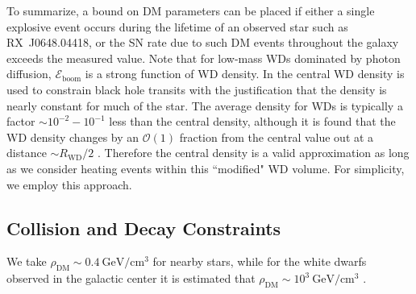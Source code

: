 \documentclass[twocolumn,preprintnumbers,amsmath,amssymb,prd, superscriptaddress]{revtex4} %
\newcommand{\Eboom}{\mathcal{E}_\text{boom}}
\newcommand{\OO}{\mathcal{O}}
\newcommand{\GeV}{\text{GeV}}
\def\r{\right)}
\def\l{\left(}
\begin{document}
To summarize, a bound on DM parameters can be placed if either a single explosive event occurs during the lifetime of an observed star such as RX~J0648.04418, or the SN rate due to such DM events throughout the galaxy exceeds the measured value.
Note that for low-mass WDs dominated by photon diffusion, $\Eboom$ is a strong function of WD density.
In \cite{Graham:2015apa} the central WD density is used to constrain black hole transits with the justification that the density is nearly constant for much of the star.
The average density for WDs is typically a factor $\sim 10^{-2} - 10^{-1}$ less than the central density, although it is found that the WD density changes by an $\OO(1)$ fraction from the central value out at a distance $\sim R_\text{WD}/2$ \cite{Chandrasekhar}.
Therefore the central density is a valid approximation as long as we consider heating events within this ``modified" WD volume.
For simplicity, we employ this approach.


\subsection{Collision and Decay Constraints}
\label{sec:CollisionConstraints}

We take $\rho_\text{DM} \sim 0.4 ~\GeV/\text{cm}^3$ for nearby stars, while for the white dwarfs observed in the galactic center it is estimated that $\rho_\text{DM} \sim 10^3 ~\text{GeV}/\text{cm}^3$ \cite{Nesti:2013uwa}.
\end{document}
